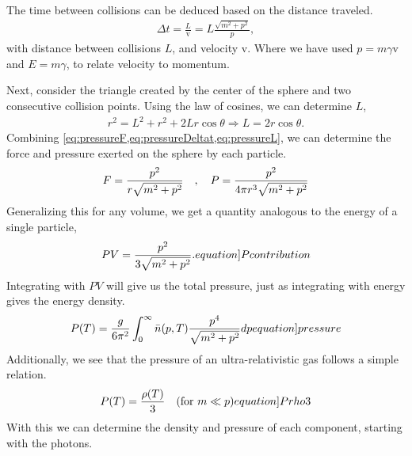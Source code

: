 The time between collisions can be deduced based on the distance traveled.
\begin{align}
    \Delta t = \frac{L}{\mathrm{v}}=L\frac{\sqrt{m^2+p^2}}{p},
    \label{eq:pressureDeltat}
\end{align}
with distance between collisions $L$, and velocity $\mathrm{v}$. Where we have used $p=m\gamma \mathrm{v}$ and $E=m\gamma$, to relate velocity to momentum.

Next, consider the triangle created by the center of the sphere and two consecutive collision points. Using the law of cosines, we can determine $L$,
\begin{align}
    r^2=L^2+r^2+2L r \cos \theta \Rightarrow
    L = 2r \cos \theta.
    \label{eq:pressureL}
\end{align}
Combining \cref{eq:pressureF,eq:pressureDeltat,eq:pressureL}, we can determine the force and pressure exerted on the sphere by each particle. 
\begin{align}
    F = \frac{p^2}{r\sqrt{m^2+p^2}} \quad , \quad P = \frac{p^2}{4\pi r^3\sqrt{m^2+p^2}}
\end{align}
Generalizing this for any volume, we get a quantity analogous to the energy of a single particle,
\begin{align}
    PV=\frac{p^2}{3\sqrt{m^2+p^2}} .
    \label[equation]{Pcontribution}
\end{align}
Integrating with $PV$ will give us the total pressure, just as integrating with energy gives the energy density.
\begin{align}
    P(T)=\frac{g}{6\pi^2}\int_{0}^{\infty}\bar{n}(p,T)\frac{p^4}{\sqrt{m^2+p^2}}dp
    \label[equation]{pressure}
\end{align}
Additionally, we see that the pressure of an ultra-relativistic gas follows a simple relation.
\begin{align}
    P(T)=\frac{\rho(T)}{3} \quad (\text{for } m\ll p)
    \label[equation]{Prho3}
\end{align}
With this we can determine the density and pressure of each component, starting with the photons.

